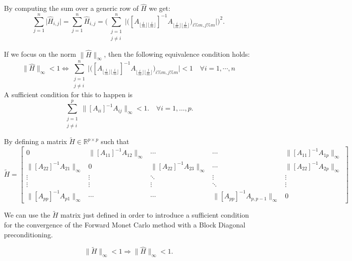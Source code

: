 \documentclass[a4paper,10pt]{article}
\begin{document}
By computing the sum over a generic row of $\hat{H}$ we get:
\[
 \sum_{j=1}^n \lvert \hat{H}_{i,j}\rvert=\sum_{j=1}^n \hat{H}_{i,j} =
 \bigg ( \sum_{\substack{j=1\\j\ne i}}^n\bigg \lvert \bigg ([A_{\lfloor
\frac{i}{m}\rfloor \lfloor
\frac{i}{m}\rfloor}]^{-1} A_{\lfloor \frac{i}{m}\rfloor \lfloor
\frac{j}{m}\rfloor}\bigg )_{i\%m,j\%m}\bigg \rvert \bigg ) ^2.
\]

If we focus on the norm $\lVert \hat{H}\rVert_{\infty}$, then the following
equivalence condition holds:
\[
 \lVert \hat{H}\rVert_{\infty}<1 \Leftrightarrow \sum_{\substack{j=1\\j\ne
i}}^n\bigg \lvert \bigg ([A_{\lfloor
\frac{i}{m}\rfloor \lfloor
\frac{i}{m}\rfloor}]^{-1} A_{\lfloor \frac{i}{m}\rfloor \lfloor
\frac{j}{m}\rfloor}\bigg )_{i\%m,j\%m}\bigg \rvert <1 \quad \forall
i=1,\cdots,n
\]
 A sufficient condition for this to happen is
 \begin{equation}
  \sum_{\substack{j=1\\j\ne i}}^p \lVert [A_{ii}]^{-1}A_{ij}\rVert_{\infty}<1.
    \label{block_cs}\quad \forall i=1,\ldots,p.
 \end{equation}

By defining a matrix $\tilde{H}\in \mathbb{R}^{p\times p}$ such that
\[
 \tilde{H}=\begin{bmatrix}0 & \lVert [A_{11}]^{-1}A_{12}\rVert_{\infty} &
\cdots &
\cdots & \lVert [A_{11}]^{-1}A_{1p}\rVert_{\infty} \\
\lVert [A_{22}]^{-1}A_{21}\rVert_{\infty} & 0 & \lVert
[A_{22}]^{-1}A_{23}\rVert_{\infty} &
\cdots & \lVert [A_{22}]^{-1}A_{2p}\rVert_{\infty} \\
\vdots & \vdots & \ddots & \vdots & \vdots\\
\vdots & \vdots & \vdots &\ddots & \vdots \\
\lVert [A_{pp}]^{-1}A_{p1}\rVert_{\infty} &  \cdots & \cdots&
\lVert [A_{pp}]^{-1}A_{p,p-1}\rVert_{\infty} & 0
\end{bmatrix}
\]

We can use the $\tilde{H}$ matrix just defined in order to introduce a
sufficient condition for the convergence of the Forward Monet Carlo method with
a Block Diagonal preconditioning.

\begin{equation}
 \lVert \tilde{H} \rVert_{\infty}<1 \Rightarrow \lVert \hat{H}
\rVert_{\infty}<1.
\end{equation}
\end{document}
